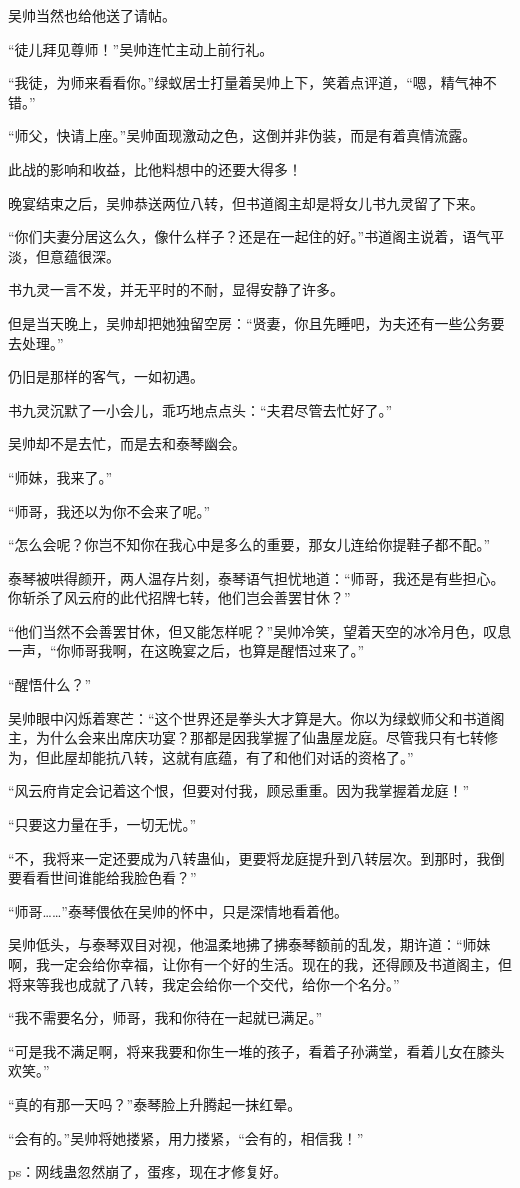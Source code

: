 \begin{this_body}
吴帅当然也给他送了请帖。

“徒儿拜见尊师！”吴帅连忙主动上前行礼。

“我徒，为师来看看你。”绿蚁居士打量着吴帅上下，笑着点评道，“嗯，精气神不错。”

“师父，快请上座。”吴帅面现激动之色，这倒并非伪装，而是有着真情流露。

此战的影响和收益，比他料想中的还要大得多！

晚宴结束之后，吴帅恭送两位八转，但书道阁主却是将女儿书九灵留了下来。

“你们夫妻分居这么久，像什么样子？还是在一起住的好。”书道阁主说着，语气平淡，但意蕴很深。

书九灵一言不发，并无平时的不耐，显得安静了许多。

但是当天晚上，吴帅却把她独留空房：“贤妻，你且先睡吧，为夫还有一些公务要去处理。”

仍旧是那样的客气，一如初遇。

书九灵沉默了一小会儿，乖巧地点点头：“夫君尽管去忙好了。”

吴帅却不是去忙，而是去和泰琴幽会。

“师妹，我来了。”

“师哥，我还以为你不会来了呢。”

“怎么会呢？你岂不知你在我心中是多么的重要，那女儿连给你提鞋子都不配。”

泰琴被哄得颜开，两人温存片刻，泰琴语气担忧地道：“师哥，我还是有些担心。你斩杀了风云府的此代招牌七转，他们岂会善罢甘休？”

“他们当然不会善罢甘休，但又能怎样呢？”吴帅冷笑，望着天空的冰冷月色，叹息一声，“你师哥我啊，在这晚宴之后，也算是醒悟过来了。”

“醒悟什么？”

吴帅眼中闪烁着寒芒：“这个世界还是拳头大才算是大。你以为绿蚁师父和书道阁主，为什么会来出席庆功宴？那都是因我掌握了仙蛊屋龙庭。尽管我只有七转修为，但此屋却能抗八转，这就有底蕴，有了和他们对话的资格了。”

“风云府肯定会记着这个恨，但要对付我，顾忌重重。因为我掌握着龙庭！”

“只要这力量在手，一切无忧。”

“不，我将来一定还要成为八转蛊仙，更要将龙庭提升到八转层次。到那时，我倒要看看世间谁能给我脸色看？”

“师哥……”泰琴偎依在吴帅的怀中，只是深情地看着他。

吴帅低头，与泰琴双目对视，他温柔地拂了拂泰琴额前的乱发，期许道：“师妹啊，我一定会给你幸福，让你有一个好的生活。现在的我，还得顾及书道阁主，但将来等我也成就了八转，我定会给你一个交代，给你一个名分。”

“我不需要名分，师哥，我和你待在一起就已满足。”

“可是我不满足啊，将来我要和你生一堆的孩子，看着子孙满堂，看着儿女在膝头欢笑。”

“真的有那一天吗？”泰琴脸上升腾起一抹红晕。

“会有的。”吴帅将她搂紧，用力搂紧，“会有的，相信我！”

ps：网线蛊忽然崩了，蛋疼，现在才修复好。

\end{this_body}

